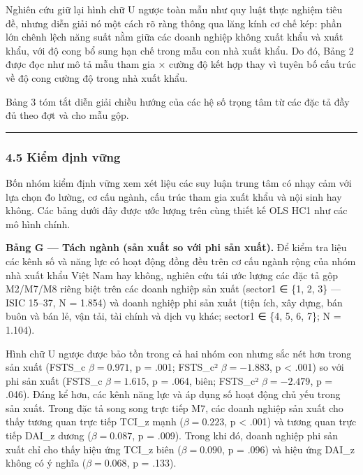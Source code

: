 \documentclass[12pt,a4paper]{article}
\begin{document}
Nghiên cứu giữ lại hình chữ U ngược toàn mẫu như quy luật thực nghiệm
tiêu đề, nhưng diễn giải nó một cách rõ ràng thông qua lăng kính cơ chế
kép: phần lớn chênh lệch năng suất nằm giữa các doanh nghiệp không xuất
khẩu và xuất khẩu, với độ cong bổ sung hạn chế trong mẫu con nhà xuất
khẩu. Do đó, Bảng 2 được đọc như mô tả mẫu tham gia × cường độ kết hợp
thay vì tuyên bố cấu trúc về độ cong cường độ trong nhà xuất khẩu.

Bảng 3 tóm tắt diễn giải chiều hướng của các hệ số trọng tâm từ các đặc
tả đầy đủ theo đợt và cho mẫu gộp.

\begin{center}\rule{0.5\linewidth}{0.5pt}\end{center}

\hypertarget{45-kiux1ec3m-ux111ux1ecbnh-vux1eefng}{%
\subsubsection{4.5 Kiểm định
vững}\label{45-kiux1ec3m-ux111ux1ecbnh-vux1eefng}}

Bốn nhóm kiểm định vững xem xét liệu các suy luận trung tâm có nhạy cảm
với lựa chọn đo lường, cơ cấu ngành, cấu trúc tham gia xuất khẩu và nội
sinh hay không. Các bảng dưới đây được ước lượng trên cùng thiết kế OLS
HC1 như các mô hình chính.

\textbf{Bảng G --- Tách ngành (sản xuất so với phi sản xuất).} Để kiểm
tra liệu các kênh số và năng lực có hoạt động đồng đều trên cơ cấu ngành
rộng của nhóm nhà xuất khẩu Việt Nam hay không, nghiên cứu tái ước lượng
các đặc tả gộp M2/M7/M8 riêng biệt trên các doanh nghiệp sản xuất
(sector1 ∈ \{1, 2, 3\} --- ISIC 15--37, N = 1.854) và doanh nghiệp phi
sản xuất (tiện ích, xây dựng, bán buôn và bán lẻ, vận tải, tài chính và
dịch vụ khác; sector1 ∈ \{4, 5, 6, 7\}; N = 1.104).

Hình chữ U ngược được bảo tồn trong cả hai nhóm con nhưng sắc nét hơn
trong sản xuất (FSTS\_c \(\beta = 0.971\), p = .001; FSTS\_c²
\(\beta = −1.883\), p \textless{} .001) so với phi sản xuất (FSTS\_c
\(\beta = 1.615\), p = .064, biên; FSTS\_c² \(\beta = −2.479\), p =
.046). Đáng kể hơn, các kênh năng lực và áp dụng số hoạt động chủ yếu
trong sản xuất. Trong đặc tả song song trực tiếp M7, các doanh nghiệp
sản xuất cho thấy tương quan trực tiếp TCI\_z mạnh (\(\beta = 0.223\), p
\textless{} .001) và tương quan trực tiếp DAI\_z dương
(\(\beta = 0.087\), p = .009). Trong khi đó, doanh nghiệp phi sản xuất
chỉ cho thấy hiệu ứng TCI\_z biên (\(\beta = 0.090\), p = .096) và hiệu
ứng DAI\_z không có ý nghĩa (\(\beta = 0.068\), p = .133).
\end{document}

